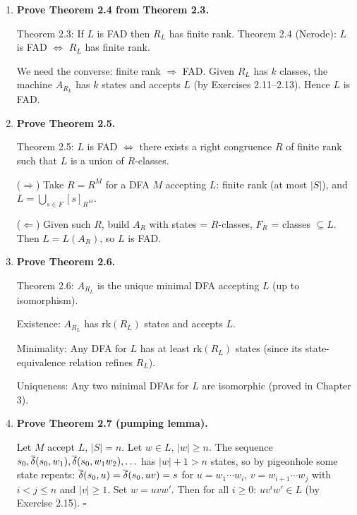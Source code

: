 \begin{enumerate}[{2.}1.]
\begin{enumerate}
\item Such a language cannot be FAD: $R_L=I$ has infinite rank (one class per string in $\{\mathbf{a}\}^*$), so by Nerode's theorem $L$ is not FAD. $\square$
\end{enumerate}

\item \textbf{Prove Theorem 2.4 from Theorem 2.3.}

Theorem 2.3: If $L$ is FAD then $R_L$ has finite rank. Theorem 2.4 (Nerode): $L$ is FAD $\Leftrightarrow$ $R_L$ has finite rank.

We need the converse: finite rank $\Rightarrow$ FAD. Given $R_L$ has $k$ classes, the machine $A_{R_L}$ has $k$ states and accepts $L$ (by Exercises 2.11--2.13). Hence $L$ is FAD.

\item \textbf{Prove Theorem 2.5.}

Theorem 2.5: $L$ is FAD $\Leftrightarrow$ there exists a right congruence $R$ of finite rank such that $L$ is a union of $R$-classes.

($\Rightarrow$) Take $R=R^M$ for a DFA $M$ accepting $L$: finite rank (at most $|S|$), and $L=\bigcup_{s\in F}[s]_{R^M}$.

($\Leftarrow$) Given such $R$, build $A_R$ with states = $R$-classes, $F_R$ = classes $\subseteq L$. Then $L=L(A_R)$, so $L$ is FAD.

\item \textbf{Prove Theorem 2.6.}

Theorem 2.6: $A_{R_L}$ is the unique minimal DFA accepting $L$ (up to isomorphism).

Existence: $A_{R_L}$ has $\mathrm{rk}(R_L)$ states and accepts $L$.

Minimality: Any DFA for $L$ has at least $\mathrm{rk}(R_L)$ states (since its state-equivalence relation refines $R_L$).

Uniqueness: Any two minimal DFAs for $L$ are isomorphic (proved in Chapter 3).

\item \textbf{Prove Theorem 2.7 (pumping lemma).}

Let $M$ accept $L$, $|S|=n$. Let $w\in L$, $|w|\geq n$. The sequence $s_0,\overline{\delta}(s_0,w_1),\overline{\delta}(s_0,w_1w_2),\ldots$ has $|w|+1>n$ states, so by pigeonhole some state repeats: $\overline{\delta}(s_0,u)=\overline{\delta}(s_0,uv)=s$ for $u=w_1\cdots w_i$, $v=w_{i+1}\cdots w_j$ with $i<j\leq n$ and $|v|\geq 1$. Set $w=uvw'$. Then for all $i\geq 0$: $uv^iw'\in L$ (by Exercise 2.15). $\square$


\end{enumerate}
